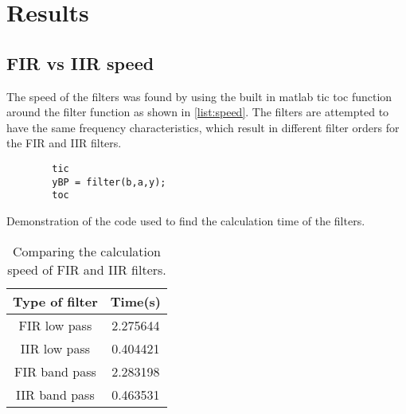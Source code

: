 
\section{Results}

\subsection{FIR vs IIR speed}
The speed of the filters was found by using the built in matlab tic toc function around the filter function as shown in \cref{list:speed}. The filters are attempted to have the same frequency characteristics, which result in different filter orders for the FIR and IIR filters.

\begin{listing}
	\begin{verbatim}
		tic
		yBP = filter(b,a,y);
		toc
	\end{verbatim}
	\caption{Demonstration of the code used to find the calculation time of the filters.}
	\label{list:speed}
\end{listing}

\begin{table}[!htb]
	\centering
	\caption{Comparing the calculation speed of FIR and IIR filters.}
	\label{tab:speed}
	\begin{tabular}{cc}
		Type of filter & Time(\si{\second}) \\
		\midrule
		FIR low pass & \num{2.275644}\\
		IIR low pass & \num{0.404421}\\
		FIR band pass & \num{2.283198}\\
		IIR band pass & \num{0.463531}
	\end{tabular}
\end{table}

